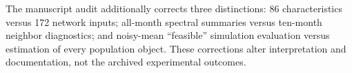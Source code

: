 \documentclass[11pt]{article}
\begin{document}
The manuscript audit additionally corrects three distinctions: 86 characteristics versus 172 network inputs; all-month spectral summaries versus ten-month neighbor diagnostics; and noisy-mean ``feasible'' simulation evaluation versus estimation of every population object. These corrections alter interpretation and documentation, not the archived experimental outcomes.
\end{document}
